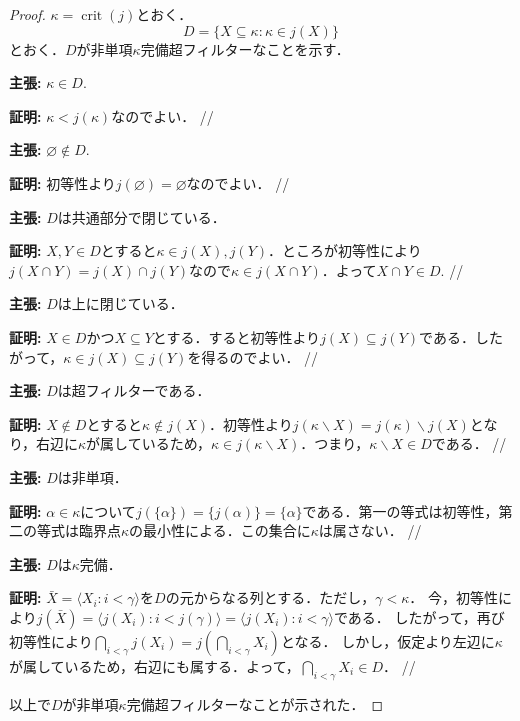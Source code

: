 \documentclass[uplatex]{jsarticle}
\newcommand{\crit}{\operatorname{crit}}
\newcommand{\seq}[1]{{\langle#1\rangle}}
\renewcommand\emptyset{\varnothing}
\renewcommand\subset{\subseteq}
\renewcommand{\setminus}{\smallsetminus}
\theoremstyle{definition}
\begin{document}
	\begin{proof}
		$\kappa = \crit(j)$とおく．
		\[
		D = \{ X \subset \kappa : \kappa \in j(X) \}
		\]
		とおく．$D$が非単項$\kappa$完備超フィルターなことを示す．
		
		\par \textbf{主張: } $\kappa \in D$.
		\par \textbf{証明: } $\kappa < j(\kappa)$なのでよい． \hfill //
		
		\par \textbf{主張: } $\emptyset\not \in D$.
		\par \textbf{証明: } 初等性より$j(\emptyset) = \emptyset$なのでよい． \hfill //
		
		\par \textbf{主張: } $D$は共通部分で閉じている．
		\par \textbf{証明: } $X, Y \in D$とすると$\kappa \in j(X), j(Y)$．ところが初等性により$j(X \cap Y) = j(X) \cap j(Y)$なので$\kappa \in j(X \cap Y)$．よって$X \cap Y \in D$. \hfill //
		
		\par \textbf{主張: } $D$は上に閉じている．
		\par \textbf{証明: } $X \in D$かつ$X \subset Y$とする．すると初等性より$j(X) \subset j(Y)$である．したがって，$\kappa \in j(X) \subset j(Y)$を得るのでよい． \hfill //
		
		\par \textbf{主張: } $D$は超フィルターである．
		\par \textbf{証明: } $X \not \in D$とすると$\kappa \not \in j(X)$．初等性より$j(\kappa \setminus X) = j(\kappa) \setminus j(X)$となり，右辺に$\kappa$が属しているため，$\kappa \in j(\kappa \setminus X)$．つまり，$\kappa \setminus X \in D$である． \hfill //
		
		\par \textbf{主張: } $D$は非単項．
		\par \textbf{証明: } 	$\alpha \in \kappa$について$j(\{\alpha\}) = \{j(\alpha)\} = \{\alpha\}$である．第一の等式は初等性，第二の等式は臨界点$\kappa$の最小性による．この集合に$\kappa$は属さない． \hfill //
		
		\par \textbf{主張: } $D$は$\kappa$完備．
		\par \textbf{証明: } 	$\bar{X} = \seq{X_i : i < \gamma }$を$D$の元からなる列とする．ただし，$\gamma < \kappa$．
		今，初等性により$j(\bar{X}) = \seq{j(X_i) : i < j(\gamma)} = \seq{j(X_i) : i < \gamma}$である．
		したがって，再び初等性により$\bigcap_{i < \gamma} j(X_i) = j(\bigcap_{i < \gamma} X_i)$となる．
		しかし，仮定より左辺に$\kappa$が属しているため，右辺にも属する．よって，$\bigcap_{i < \gamma} X_i \in D$． \hfill //
		
		\par 以上で$D$が非単項$\kappa$完備超フィルターなことが示された．
		
	\end{proof}
	
\end{document}
